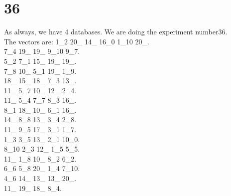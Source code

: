 \chapter{36}
\indent As always, we have 4 databases. We are doing the experiment number36.\\
The vectors are:
1\_2 20\_ 14\_ 16\_0 1\_10 20\_.\\7\_4 19\_ 19\_ 9\_10 9\_7.\\5\_2 7\_1 15\_ 19\_ 19\_.\\7\_8 10\_ 5\_1 19\_ 1\_9.\\18\_ 15\_ 18\_ 7\_3 13\_.\\11\_ 5\_7 10\_ 12\_ 2\_4.\\11\_ 5\_4 7\_7 8\_3 16\_.\\8\_1 18\_ 10\_ 6\_1 16\_.\\14\_ 8\_8 13\_ 3\_4 2\_8.\\11\_ 9\_5 17\_ 3\_1 1\_7.\\1\_3 3\_5 13\_ 2\_1 10\_0.\\8\_10 2\_3 12\_ 1\_5 5\_5.\\11\_ 1\_8 10\_ 8\_2 6\_2.\\6\_6 5\_8 20\_ 1\_4 7\_10.\\4\_6 14\_ 13\_ 13\_ 20\_.\\11\_ 19\_ 18\_ 8\_4.\\